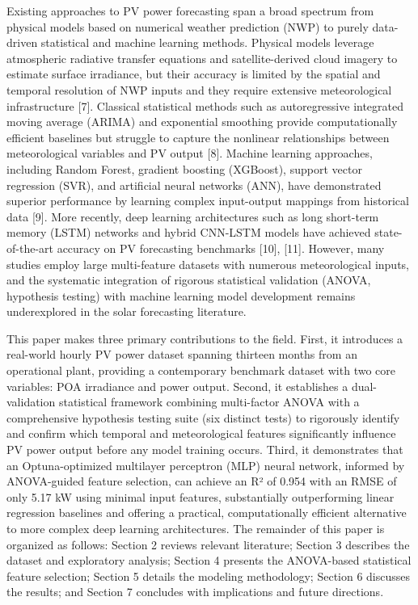 \documentclass[
  11pt,
]{article}
\begin{document}
Existing approaches to PV power forecasting span a broad spectrum from
physical models based on numerical weather prediction (NWP) to purely
data-driven statistical and machine learning methods. Physical models
leverage atmospheric radiative transfer equations and satellite-derived
cloud imagery to estimate surface irradiance, but their accuracy is
limited by the spatial and temporal resolution of NWP inputs and they
require extensive meteorological infrastructure {[}7{]}. Classical
statistical methods such as autoregressive integrated moving average
(ARIMA) and exponential smoothing provide computationally efficient
baselines but struggle to capture the nonlinear relationships between
meteorological variables and PV output {[}8{]}. Machine learning
approaches, including Random Forest, gradient boosting (XGBoost),
support vector regression (SVR), and artificial neural networks (ANN),
have demonstrated superior performance by learning complex input-output
mappings from historical data {[}9{]}. More recently, deep learning
architectures such as long short-term memory (LSTM) networks and hybrid
CNN-LSTM models have achieved state-of-the-art accuracy on PV
forecasting benchmarks {[}10{]}, {[}11{]}. However, many studies employ
large multi-feature datasets with numerous meteorological inputs, and
the systematic integration of rigorous statistical validation (ANOVA,
hypothesis testing) with machine learning model development remains
underexplored in the solar forecasting literature.

This paper makes three primary contributions to the field. First, it
introduces a real-world hourly PV power dataset spanning thirteen months
from an operational plant, providing a contemporary benchmark dataset
with two core variables: POA irradiance and power output. Second, it
establishes a dual-validation statistical framework combining
multi-factor ANOVA with a comprehensive hypothesis testing suite (six
distinct tests) to rigorously identify and confirm which temporal and
meteorological features significantly influence PV power output before
any model training occurs. Third, it demonstrates that an
Optuna-optimized multilayer perceptron (MLP) neural network, informed by
ANOVA-guided feature selection, can achieve an R² of 0.954 with an RMSE
of only 5.17 kW using minimal input features, substantially
outperforming linear regression baselines and offering a practical,
computationally efficient alternative to more complex deep learning
architectures. The remainder of this paper is organized as follows:
Section 2 reviews relevant literature; Section 3 describes the dataset
and exploratory analysis; Section 4 presents the ANOVA-based statistical
feature selection; Section 5 details the modeling methodology; Section 6
discusses the results; and Section 7 concludes with implications and
future directions.
\end{document}
